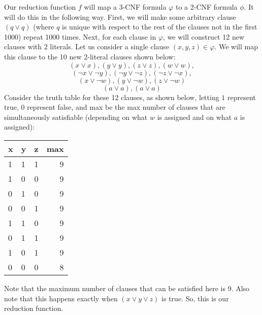 \documentclass{article}
\begin{document}
\begin{description}
        Our reduction function $f$ will map a 3-CNF formula $\varphi$ to a 2-CNF
        formula $\phi$. It will do this in the following way. First,
        we will make some arbitrary clause $(q \vee q)$ (where $q$ is
        unique with respect to the rest of the clauses not in the first 1000)
        repeat 1000 times. Next, for each clause in
        $\varphi$, we will construct 12 new clauses with 2 literals. Let us consider
        a single clause $(x, y, z) \in \varphi$. We will map this clause to the
        10 new 2-literal clauses shown below:
        \[ (x \vee x), (y \vee y), (z \vee z), (w \vee w), \]
        \[ (\neg x \vee \neg y), (\neg y \vee \neg z), (\neg z \vee \neg x), \]
        \[ (x \vee \neg w), (y \vee \neg w), (z \vee \neg w) \]
        \[ (a \vee a), (a \vee a) \]
        Consider the truth table for these 12 clauses, as shown below, letting $1$
        represent true, $0$ represent false, and max be the max number of clauses
        that are simultaneously satisfiable (depending on what $w$ is assigned
        and on what $a$ is assigned):
        \begin{center}
            \begin{tabular}{ | l | l | c | r | }
                \hline
                x & y & z & max \\ \hline
                1 & 1 & 1 & 9 \\ \hline
                1 & 0 & 0 & 9 \\ \hline
                0 & 1 & 0 & 9 \\ \hline
                0 & 0 & 1 & 9 \\ \hline
                1 & 1 & 0 & 9 \\ \hline
                0 & 1 & 1 & 9 \\ \hline
                1 & 0 & 1 & 9 \\ \hline
                0 & 0 & 0 & 8 \\ \hline
            \end{tabular}
        \end{center}
        Note that the maximum number of clauses that can be satisfied here is 9. Also
        note that this happens exactly when $(x \vee y \vee z)$ is true. So, this
        is our reduction function.


\end{description}
\end{document}
